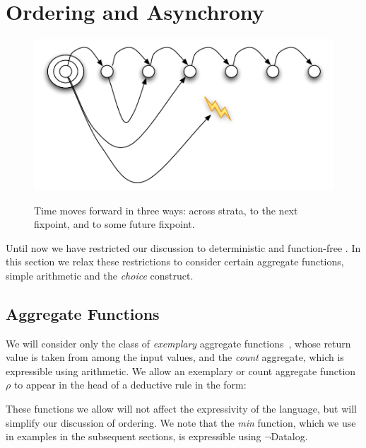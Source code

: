 \section{Ordering and Asynchrony}

\begin{figure}[t]
  \centering
  \includegraphics[width=0.75\linewidth]{dedalus-time.pdf}
  \label{fig:dedalus-time}
  \caption{Time moves forward in three ways: across strata, to the next fixpoint, and to some future fixpoint.}
\vspace{-8pt}
\end{figure}

Until now we have restricted our discussion to deterministic and function-free \lang.  In this section
we relax these restrictions to consider certain aggregate functions, simple arithmetic and the \emph{choice} construct.  


\subsection{Aggregate Functions}

We will consider only the class of \emph{exemplary} aggregate functions~\cite{tag}, whose return value
is taken from among the input values, and the \emph{count} aggregate, which is expressible using arithmetic.  
We allow an exemplary or count aggregate function $\rho$ to appear in the head of a deductive rule
in the form:


These functions we allow will not affect the expressivity of the language, but will simplify our discussion of 
ordering.  We note that the \emph{min} function, which we use in examples in the subsequent sections,
is expressible using $\lnot$Datalog.

